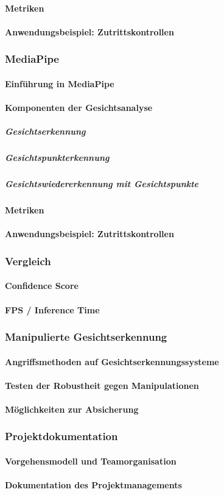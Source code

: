 \paragraph{Metriken}
\paragraph{Anwendungsbeispiel: Zutrittskontrollen}

\subsubsection{MediaPipe}
\paragraph{Einführung in MediaPipe}
\paragraph{Komponenten der Gesichtsanalyse}
\subparagraph{Gesichtserkennung}
\subparagraph{Gesichtspunkterkennung}
\subparagraph{Gesichtswiedererkennung mit Gesichtspunkte}
\paragraph{Metriken}
\paragraph{Anwendungsbeispiel: Zutrittskontrollen}

\subsubsection{Vergleich}
\paragraph{Confidence Score}
\paragraph{FPS / Inference Time}

\subsubsection{Manipulierte Gesichtserkennung}
\paragraph{Angriffsmethoden auf Gesichtserkennungssysteme}
\paragraph{Testen der Robustheit gegen Manipulationen}
\paragraph{Möglichkeiten zur Absicherung}

\subsubsection{Projektdokumentation}
\paragraph{Vorgehensmodell und Teamorganisation}
\paragraph{Dokumentation des Projektmanagements}